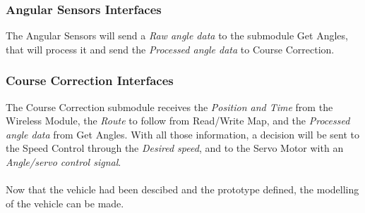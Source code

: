 \subsubsection{Angular Sensors Interfaces}
The Angular Sensors will send a \textit{Raw angle data} to the submodule  Get Angles, that will process it and send the \textit{Processed angle data} to Course Correction.

\subsubsection{Course Correction Interfaces}
The Course Correction submodule receives the \textit{Position and Time} from the Wireless Module, the \textit{Route} to follow from Read/Write Map, and the \textit{Processed angle data} from Get Angles. With all those information, a decision will be sent to the Speed Control through the \textit{Desired speed}, and to the Servo Motor with an \textit{Angle/servo control signal}.\\\\


Now that the vehicle had been descibed and the prototype defined, the modelling of the vehicle can be made.


